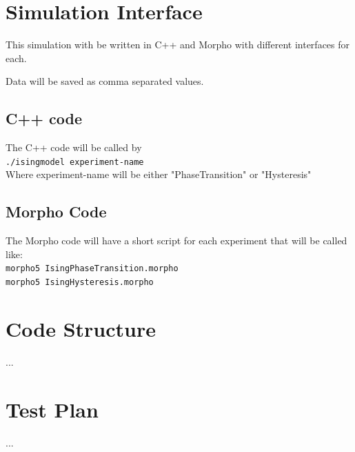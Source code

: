 \documentclass[]{scrartcl}
\begin{document}
\section{Simulation Interface}

This simulation with be written in C++ and Morpho with different interfaces for each.

Data will be saved as comma separated values.
\subsection{C++ code}

The C++ code will be called by \\
	
\verb|./isingmodel experiment-name|\\
	
Where experiment-name will be either "PhaseTransition" or "Hysteresis"

\subsection{Morpho Code}

The Morpho code will have a short script for each experiment that will be called like:\\
	
\verb|morpho5 IsingPhaseTransition.morpho|\\
	
\verb|morpho5 IsingHysteresis.morpho|
	

	\section{Code Structure}
	...
	\section{Test Plan}
	...
\end{document}
